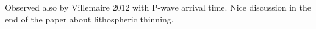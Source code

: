 \documentclass[12pt]{article}
\begin{document}
			Observed also by Villemaire 2012 with P-wave arrival time. Nice discussion in the end of the paper about lithospheric thinning. 


			
\end{document}
